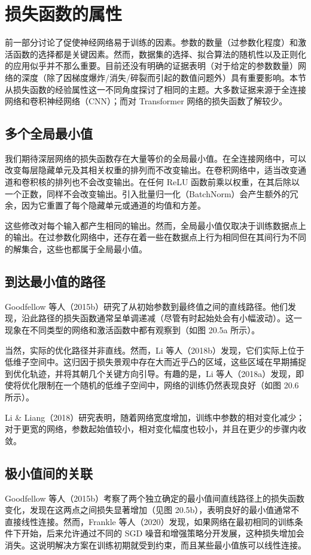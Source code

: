 \section{损失函数的属性}
前一部分讨论了促使神经网络易于训练的因素。参数的数量（过参数化程度）和激活函数的选择都是关键因素。然而，数据集的选择、拟合算法的随机性以及正则化的应用似乎并不那么重要。目前还没有明确的证据表明（对于给定的参数数量）网络的深度（除了因梯度爆炸/消失/碎裂而引起的数值问题外）具有重要影响。本节从损失函数的经验属性这一不同角度探讨了相同的主题。大多数证据来源于全连接网络和卷积神经网络（CNN）；而对 Transformer 网络的损失函数了解较少。

\subsection{多个全局最小值}
我们期待深层网络的损失函数存在大量等价的全局最小值。在全连接网络中，可以改变每层隐藏单元及其相关权重的排列而不改变输出。在卷积网络中，适当改变通道和卷积核的排列也不会改变输出。在任何 ReLU 函数前乘以权重，在其后除以一个正数，同样不会改变输出。引入批量归一化（BatchNorm）会产生额外的冗余，因为它重置了每个隐藏单元或通道的均值和方差。

这些修改对每个输入都产生相同的输出。然而，全局最小值仅取决于训练数据点上的输出。在过参数化网络中，还存在着一些在数据点上行为相同但在其间行为不同的解集合，这些也都属于全局最小值。

\subsection{到达最小值的路径}
Goodfellow 等人（2015b）研究了从初始参数到最终值之间的直线路径。他们发现，沿此路径的损失函数通常呈单调递减（尽管有时起始处会有小幅波动）。这一现象在不同类型的网络和激活函数中都有观察到（如图 20.5a 所示）。

当然，实际的优化路径并非直线。然而，Li 等人（2018b）发现，它们实际上位于低维子空间中。这归因于损失景观中存在大而近乎凸的区域，这些区域在早期捕捉到优化轨迹，并将其朝几个关键方向引导。有趣的是，Li 等人（2018a）发现，即使将优化限制在一个随机的低维子空间中，网络的训练仍然表现良好（如图 20.6 所示）。

Li \& Liang（2018）研究表明，随着网络宽度增加，训练中参数的相对变化减少；对于更宽的网络，参数起始值较小，相对变化幅度也较小，并且在更少的步骤内收敛。

\subsection{极小值间的关联}
Goodfellow 等人（2015b）考察了两个独立确定的最小值间直线路径上的损失函数变化，发现在这两点之间损失显著增加（见图 20.5b），表明良好的最小值通常不直接线性连接。然而，Frankle 等人（2020）发现，如果网络在最初相同的训练条件下开始，后来允许通过不同的 SGD 噪音和增强策略分开发展，这种损失增加会消失。这说明解决方案在训练初期就受到约束，而且某些最小值族可以线性连接。

